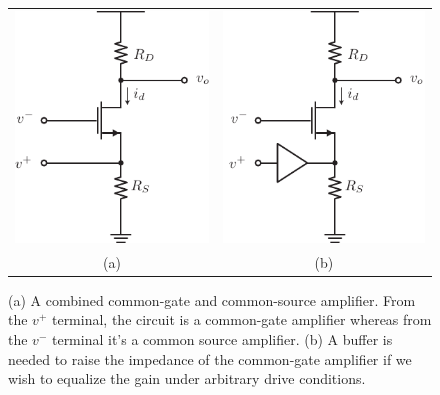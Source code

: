 \begin{figure}[tb]
\centering
\begin{tabular}{cc}
\includegraphics[scale=1]{amp_diff_CS_CG.pdf} &
\includegraphics[scale=1]{amp_diff_CS_CG_buffer.pdf}\\
(a) & (b)\\
\end{tabular}
\caption{(a) A combined common-gate and common-source amplifier.  From the $v^+$ terminal, the circuit is a common-gate amplifier whereas from the $v^-$ terminal it's a common source amplifier.  (b) A buffer is needed to raise the impedance of the common-gate amplifier if we wish to equalize the gain under arbitrary drive conditions.}
\label{fig:amp_diff_CS_CG.pdf}
\end{figure}
